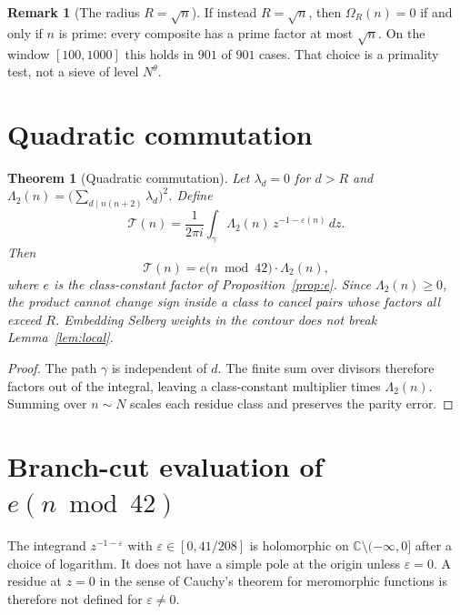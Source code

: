 \documentclass[11pt,a4paper]{article}
\theoremstyle{plain}
\newtheorem{theorem}{Theorem}
\theoremstyle{definition}
\newtheorem{remark}{Remark}
\theoremstyle{plain}
\numberwithin{equation}{section}
\begin{document}
\begin{remark}[The radius \(R=\sqrt{n}\)]
If instead \(R=\sqrt{n}\), then \(\Omega_R(n)=0\) if and only if \(n\) is prime: every composite has a prime factor at most \(\sqrt{n}\). On the window \([100,1000]\) this holds in \(901\) of \(901\) cases. That choice is a primality test, not a sieve of level \(N^{\theta}\).
\end{remark}

\section{Quadratic commutation}
\label{sec:commute}

\begin{theorem}[Quadratic commutation]
\label{thm:commute}
Let \(\lambda_d=0\) for \(d>R\) and \(\Lambda_2(n)=\bigl(\sum_{d\mid n(n+2)}\lambda_d\bigr)^2\). Define
\begin{equation}
\label{eq:T}
\mathcal{T}(n)=\frac{1}{2\pi i}\int_{\gamma}\Lambda_2(n)\,z^{-1-\varepsilon(n)}\,dz.
\end{equation}
Then
\begin{equation}
\label{eq:factor}
\mathcal{T}(n)=e\bigl(n\bmod 42\bigr)\cdot\Lambda_2(n),
\end{equation}
where \(e\) is the class-constant factor of Proposition~\ref{prop:e}. Since \(\Lambda_2(n)\ge 0\), the product cannot change sign inside a class to cancel pairs whose factors all exceed \(R\). Embedding Selberg weights in the contour does not break Lemma~\ref{lem:local}.
\end{theorem}

\begin{proof}
The path \(\gamma\) is independent of \(d\). The finite sum over divisors therefore factors out of the integral, leaving a class-constant multiplier times \(\Lambda_2(n)\). Summing over \(n\sim N\) scales each residue class and preserves the parity error.
\end{proof}

\section{Branch-cut evaluation of \(e(n\bmod 42)\)}
\label{sec:branch}

The integrand \(z^{-1-\varepsilon}\) with \(\varepsilon\in[0,41/208]\) is holomorphic on \(\mathbb{C}\setminus(-\infty,0]\) after a choice of logarithm. It does not have a simple pole at the origin unless \(\varepsilon=0\). A residue at \(z=0\) in the sense of Cauchy's theorem for meromorphic functions is therefore not defined for \(\varepsilon\neq 0\).
\end{document}
